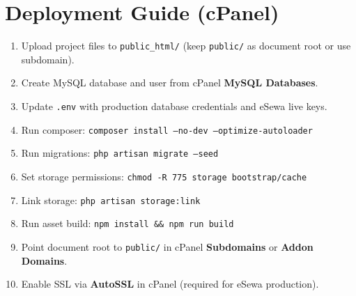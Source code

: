 \documentclass[12pt,a4paper]{report}
\begin{document}
\chapter{Deployment Guide (cPanel)}

\begin{enumerate}
  \item Upload project files to \texttt{public\_html/} (keep \texttt{public/} as document root or use subdomain).
  \item Create MySQL database and user from cPanel \textbf{MySQL Databases}.
  \item Update \texttt{.env} with production database credentials and eSewa live keys.
  \item Run composer: \texttt{composer install --no-dev --optimize-autoloader}
  \item Run migrations: \texttt{php artisan migrate --seed}
  \item Set storage permissions: \texttt{chmod -R 775 storage bootstrap/cache}
  \item Link storage: \texttt{php artisan storage:link}
  \item Run asset build: \texttt{npm install \&\& npm run build}
  \item Point document root to \texttt{public/} in cPanel \textbf{Subdomains} or \textbf{Addon Domains}.
  \item Enable SSL via \textbf{AutoSSL} in cPanel (required for eSewa production).
\end{enumerate}
\end{document}
